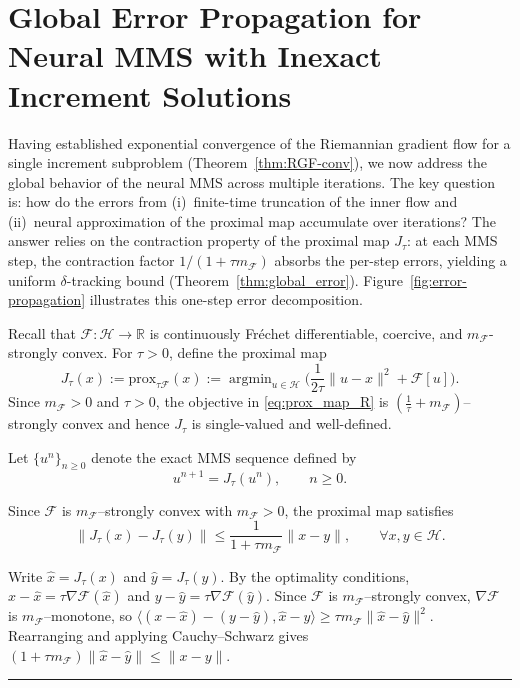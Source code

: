 \documentclass[twoside,11pt]{article}
\newcommand{\BlackBoxProof}{\rule{1.5ex}{1.5ex}}
\renewenvironment{proof}{\par\noindent{\bf Proof\ }}{\hfill\BlackBoxProof\par\medskip}
\newcommand{\rev}[1]{#1}                           %
\newcommand{\argmin}{\mathop{\mathrm{arg min}}}
\newcommand{\calF}{\mathcal{F}}
\begin{document}
\section{Global Error Propagation for Neural MMS with Inexact Increment Solutions}\label{sec:error-propagation}
\rev{%
Having established exponential convergence of the Riemannian gradient flow for a single
increment subproblem (Theorem~\ref{thm:RGF-conv}), we now address the global behavior
of the neural MMS across multiple iterations.
The key question is: how do the errors from (i)~finite-time truncation of the inner flow
and (ii)~neural approximation of the proximal map accumulate over iterations?
The answer relies on the contraction property of the proximal map $J_\tau$:
at each MMS step, the contraction factor $1/(1+\tau m_\calF)$ absorbs the per-step errors,
yielding a uniform $\delta$-tracking bound (Theorem~\ref{thm:global_error}).
Figure~\ref{fig:error-propagation} illustrates this one-step error decomposition.
}

Recall that $\mathcal{F}:\mathcal{H}\to\mathbb{R}$ is continuously Fr\'echet differentiable, coercive, and $m_\mathcal{F}$-strongly convex. For $\tau>0$, define the proximal map
\begin{equation}\label{eq:prox_map_R}
J_\tau(x) := \mbox{prox}_{\tau \mathcal{F}}(x)
 := \argmin_{u\in \mathcal H}\Big(\frac{1}{2\tau}\|u-x\|^2+\mathcal F[u]\Big).
\end{equation}
Since $m_\calF>0$ and $\tau>0$, the objective in \eqref{eq:prox_map_R} is $(\frac1\tau+ m_\calF)$--strongly convex and hence $J_\tau$ is single-valued and well-defined.



Let $\{u^n\}_{n\ge 0}$ denote the exact MMS sequence defined by
\begin{equation*}
u^{n+1}   =  J_\tau(u^n),\qquad n\ge 0.
\end{equation*}

\begin{lemma}\label{lem:lip_J_tau}
Since $\mathcal{F}$ is $m_\mathcal{F}$--strongly convex with $m_\calF>0$, the proximal map satisfies
\begin{equation*}
\|J_\tau (x)-J_\tau(y)\| \le \frac{1}{1+\tau m_\mathcal{F}} \|x-y\|,\qquad \forall x,y\in \mathcal{H}.
\end{equation*}
\end{lemma}
\begin{proof}
Write $\hat x=J_\tau(x)$ and $\hat y=J_\tau(y)$. By the optimality conditions, $x-\hat x=\tau\nabla\mathcal{F}(\hat x)$ and $y-\hat y=\tau\nabla\mathcal{F}(\hat y)$. Since $\mathcal{F}$ is $m_\mathcal{F}$--strongly convex, $\nabla\mathcal{F}$ is $m_\mathcal{F}$--monotone, so
$\langle (x-\hat x)-(y-\hat y),\hat x-\hat y\rangle \ge \tau m_\mathcal{F}\|\hat x-\hat y\|^2$.
Rearranging and applying Cauchy--Schwarz gives $(1+\tau m_\mathcal{F})\|\hat x-\hat y\|\le\|x-y\|$.
\end{proof}
\end{document}
